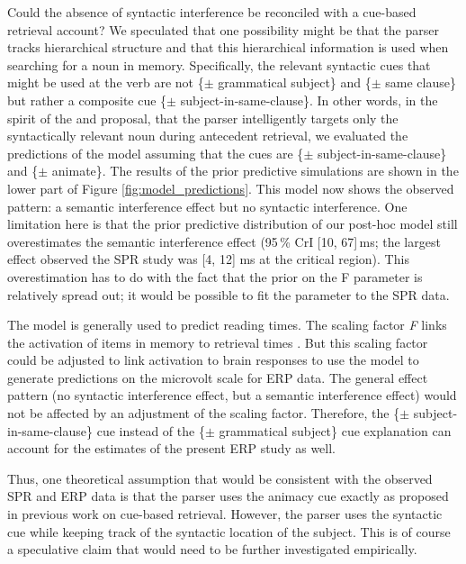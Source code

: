 \documentclass[a4paper, man, floatsintext]{apa7}
\begin{document}
Could the absence of syntactic interference be reconciled with a cue-based retrieval account? We speculated that one possibility might be that the parser tracks hierarchical structure and that this hierarchical information is used when searching for a noun in memory. Specifically, the relevant syntactic cues that might be used at the verb are not  \{$\pm$ grammatical subject\} and \{$\pm$ same clause\} but rather a composite cue \{$\pm$ subject-in-same-clause\}. In other words, in the spirit of the  \textcite{dillon2013} and \textcite{Sturt2003} proposal, that the parser intelligently targets only the syntactically relevant noun during antecedent retrieval, we evaluated the predictions of the model assuming that the cues are \{$\pm$ subject-in-same-clause\} and \{$\pm$ animate\}. The results of the prior predictive simulations are shown in 
the lower part of Figure \ref{fig:model_predictions}. This model now shows the observed pattern: a semantic interference effect but no syntactic interference. One limitation here is that the prior predictive distribution of our post-hoc  model still overestimates the semantic interference effect (95\,\% CrI [10, 67]\,ms; the largest effect observed the SPR study was [4, 12] ms at the critical region). This overestimation has to do with the fact that the prior on the F parameter is relatively spread out; it would be  possible to fit the parameter to the SPR data.

The \citet{Lewis2005} model is generally used to predict reading times. The scaling factor \textit{F}  links the activation of items in memory to retrieval times \citep{Lewis2005}. But this scaling factor could be adjusted to link activation to brain responses to use the model to generate predictions on the microvolt scale for ERP data. The general effect pattern (no syntactic interference effect, but a semantic interference effect) would not be affected by an adjustment of the scaling factor. Therefore, the \{$\pm$ subject-in-same-clause\} cue instead of the \{$\pm$ grammatical subject\} cue explanation can account for the estimates of the present ERP study as well.

Thus, one theoretical assumption that would be consistent with the observed SPR and ERP data is that the parser uses the animacy cue exactly as proposed in previous work on cue-based retrieval. However, the parser uses the syntactic cue while keeping track of the syntactic location of the subject. This is of course a speculative claim that would need to be further investigated empirically. 
\end{document}
